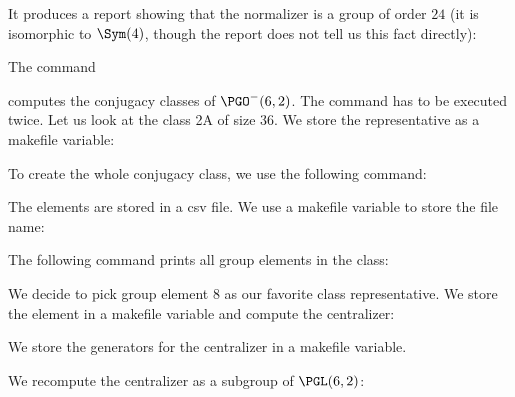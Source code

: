 
It produces a report showing that the normalizer is a group of order $24$ 
(it is isomorphic to $\Sym(4)$, though the report does not tell us this fact directly):



\bigskip


The command 


computes the conjugacy classes of $\PGO^-(6,2)$. 
The command has to be executed twice.
Let us look at the class 2A of size 36. We store the representative 
as a makefile variable:


To create the whole conjugacy class, we use the following command:


The elements are stored in a csv file.
We use a makefile variable to store the file name:


The following command prints all group elements in the class:


We decide to pick group element 8 as our favorite class representative.
We store the element in a makefile variable and compute the centralizer:




We store the generators for the centralizer in a makefile variable.


We recompute the centralizer as a subgroup of $\PGL(6,2)$:









